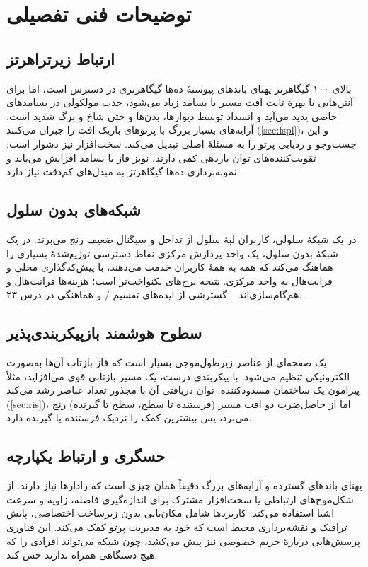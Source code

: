 \documentclass[11pt,a4paper]{article}
\begin{document}
\section{توضیحات فنی تفصیلی}

\subsection{ارتباط زیرتراهرتز}
بالای ۱۰۰ گیگاهرتز پهنای باندهای پیوستهٔ ده‌ها گیگاهرتزی در دسترس است، اما برای آنتن‌هایی با بهرهٔ ثابت افت مسیر با بسامد زیاد می‌شود، جذب مولکولی
در بسامدهای خاصی پدید می‌آید و انسداد توسط دیوارها، بدن‌ها و حتی شاخ و برگ شدید است. آرایه‌های بسیار بزرگ با پرتوهای باریک افت را جبران می‌کنند
(\cref{sec:fspl})، و این جست‌وجو و ردیابی پرتو را به مسئلهٔ اصلی تبدیل می‌کند. سخت‌افزار نیز دشوار است: تقویت‌کننده‌های توان بازدهی کمی دارند،
نویز فاز با بسامد افزایش می‌یابد و نمونه‌برداری ده‌ها گیگاهرتز به مبدل‌های کم‌دقت نیاز دارد.

\subsection{شبکه‌های بدون سلول}
در یک شبکهٔ سلولی، کاربران لبهٔ سلول از تداخل و سیگنال ضعیف رنج می‌برند. در یک شبکهٔ بدون سلول، یک واحد پردازش مرکزی نقاط دسترسی توزیع‌شدهٔ
بسیاری را هماهنگ می‌کند که همه به همهٔ کاربران خدمت می‌دهند، با پیش‌کدگذاری محلی و فرانت‌هال به واحد مرکزی. نتیجه نرخ‌های یکنواخت‌تر است؛ هزینه‌ها
فرانت‌هال و هم‌گام‌سازی‌اند -- گسترشی از ایده‌های تقسیم / و هماهنگی در درس ۲۳.

\subsection{سطوح هوشمند بازپیکربندی‌پذیر}
یک  صفحه‌ای از عناصر زیرطول‌موجی بسیار است که فاز بازتاب آن‌ها به‌صورت الکترونیکی تنظیم می‌شود. با پیکربندی درست، یک مسیر بازتابی قوی
می‌افزاید، مثلاً پیرامون یک ساختمان مسدودکننده. توان دریافتی آن با مجذور تعداد عناصر رشد می‌کند (\cref{sec:ris})، اما از حاصل‌ضرب دو افت مسیر (فرستنده
تا سطح، سطح تا گیرنده) رنج می‌برد، پس بیشترین کمک را نزدیک فرستنده یا گیرنده دارد.

\subsection{حسگری و ارتباط یکپارچه}
پهنای باندهای گسترده و آرایه‌های بزرگ دقیقاً همان چیزی است که رادارها نیاز دارند.  از شکل‌موج‌های ارتباطی یا سخت‌افزار مشترک برای اندازه‌گیری
فاصله، زاویه و سرعت اشیا استفاده می‌کند. کاربردها شامل مکان‌یابی بدون زیرساخت اختصاصی، پایش ترافیک و نقشه‌برداری محیط است که خود به مدیریت پرتو
کمک می‌کند. این فناوری پرسش‌هایی دربارهٔ حریم خصوصی نیز پیش می‌کشد، چون شبکه می‌تواند افرادی را که هیچ دستگاهی همراه ندارند حس کند.
\end{document}
